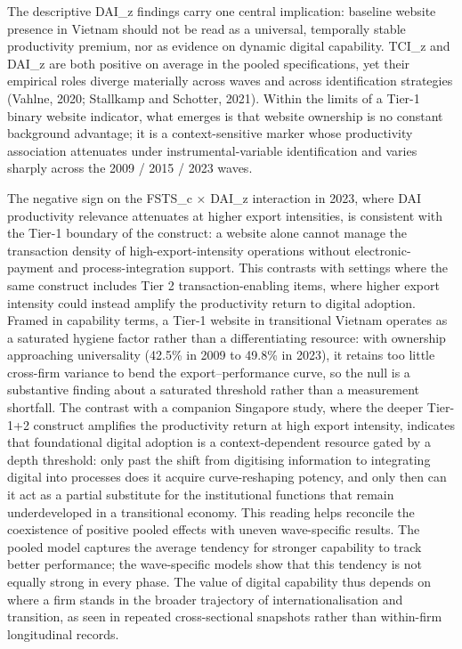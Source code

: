 \documentclass[12pt,a4paper]{article}
\begin{document}
The descriptive DAI\_z findings carry one central implication: baseline
website presence in Vietnam should not be read as a universal,
temporally stable productivity premium, nor as evidence on dynamic
digital capability. TCI\_z and DAI\_z are both positive on average in
the pooled specifications, yet their empirical roles diverge materially
across waves and across identification strategies (Vahlne, 2020;
Stallkamp and Schotter, 2021). Within the limits of a Tier-1 binary
website indicator, what emerges is that website ownership is no constant
background advantage; it is a context-sensitive marker whose
productivity association attenuates under instrumental-variable
identification and varies sharply across the 2009 / 2015 / 2023 waves.

The negative sign on the FSTS\_c × DAI\_z interaction in 2023, where DAI
productivity relevance attenuates at higher export intensities, is
consistent with the Tier-1 boundary of the construct: a website alone
cannot manage the transaction density of high-export-intensity
operations without electronic-payment and process-integration support.
This contrasts with settings where the same construct includes Tier 2
transaction-enabling items, where higher export intensity could instead
amplify the productivity return to digital adoption. Framed in
capability terms, a Tier-1 website in transitional Vietnam operates as a
saturated hygiene factor rather than a differentiating resource: with
ownership approaching universality (42.5\% in 2009 to 49.8\% in 2023),
it retains too little cross-firm variance to bend the
export--performance curve, so the null is a substantive finding about a
saturated threshold rather than a measurement shortfall. The contrast
with a companion Singapore study, where the deeper Tier-1+2 construct
amplifies the productivity return at high export intensity, indicates
that foundational digital adoption is a context-dependent resource gated
by a depth threshold: only past the shift from digitising information to
integrating digital into processes does it acquire curve-reshaping
potency, and only then can it act as a partial substitute for the
institutional functions that remain underdeveloped in a transitional
economy. This reading helps reconcile the coexistence of positive pooled
effects with uneven wave-specific results. The pooled model captures the
average tendency for stronger capability to track better performance;
the wave-specific models show that this tendency is not equally strong
in every phase. The value of digital capability thus depends on where a
firm stands in the broader trajectory of internationalisation and
transition, as seen in repeated cross-sectional snapshots rather than
within-firm longitudinal records.
\end{document}
